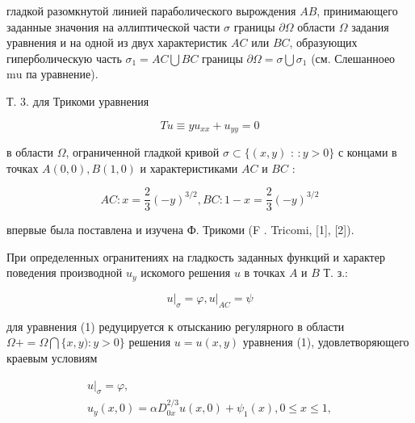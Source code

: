 \documentclass[10pt]{article}
\begin{document}
гладкой разомкнутой линией параболического вырождения $A B$, принимающего заданные значөния на әллиптической части $\sigma$ границы $\partial \Omega$ области $\Omega$ задания уравнения и на одной из двух характеристик $A C$ или $B C$, образующих гиперболическую часть $\sigma_{1}=A C \bigcup B C$ границы $\partial \Omega=\sigma \bigcup \sigma_{1}$ (см. Слешанноео $\mathrm{mu}$ па уравнение).



Т. 3. для Трикоми уравнения



\[

T u \equiv y u_{x x}+u_{y y}=0

\]



в области $\Omega$, ограниченной гладкой кривой $\sigma \subset\{(x, y)$ : $: y>0\}$ с концами в точках $A(0,0), B(1,0)$ и характеристиками $A C$ и $B C$ :



\[

A C: x=\frac{2}{3}(-y)^{3 / 2}, B C: 1-x=\frac{2}{3}(-y)^{3 / 2}

\]



впервые была поставлена и изучена Ф. Трикоми (F . Tricomi, [1], [2]).



При определенных огранитениях на гладкость заданных функций и характер поведения производной $u_{y}$ искомого решения $u$ в точках $A$ и $B$ Т. з.:



\[

\left.u\right|_{\sigma}=\varphi,\left.u\right|_{A C}=\psi

\]



для уравнения (1) редуцируется к отысканию регулярного в области $\Omega+=\Omega \bigcap\{x, y): y>0\}$ решения $u=u(x, y)$ уравнения (1), удовлетворяющего краевым условиям



\[

\begin{gathered}

\left.u\right|_{\sigma}=\varphi, \\

u_{y}(x, 0)=\alpha D_{0 x}^{2 / 3} u(x, 0)+\psi_{1}(x), 0 \leqslant x \leqslant 1,

\end{gathered}

\]
\end{document}

